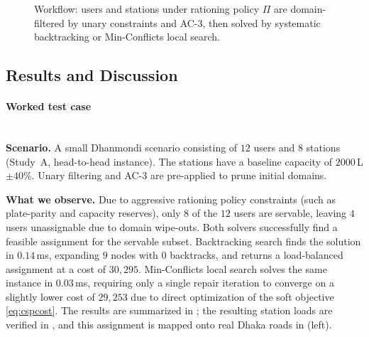 \documentclass{ai-lab-report}
\begin{document}
\begin{figure}[H]
  \centering
  \caption{Workflow: users and stations under rationing policy $\Pi$ are domain-filtered by unary constraints and AC-3, then solved by systematic backtracking or Min-Conflicts local search.}
  \label{fig:a2workflow}
\end{figure}

\subsection{Results and Discussion}
\label{sec:a2results}

\paragraph{Worked test case}
\mbox{}\\
\textbf{Scenario.} A small Dhanmondi scenario consisting of $12$ users and $8$ stations (Study~A, head-to-head instance). The stations have a baseline capacity of $2000$\,L $\pm 40\%$. Unary filtering and AC-3 are pre-applied to prune initial domains.

\textbf{What we observe.} Due to aggressive rationing policy constraints (such as plate-parity and capacity reserves), only $8$ of the $12$ users are servable, leaving $4$ users unassignable due to domain wipe-outs. Both solvers successfully find a feasible assignment for the servable subset. Backtracking search finds the solution in $0.14$\,ms, expanding $9$ nodes with $0$ backtracks, and returns a load-balanced assignment at a cost of $30{,}295$. Min-Conflicts local search solves the same instance in $0.03$\,ms, requiring only a single repair iteration to converge on a slightly lower cost of $29{,}253$ due to direct optimization of the soft objective \cref{eq:cspcost}. The results are summarized in ; the resulting station loads are verified in , and this assignment is mapped onto real Dhaka roads in  (left).
\end{document}
